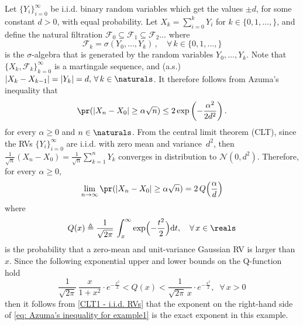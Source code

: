 \documentclass{article}
\theoremstyle{plain}
\begin{document}
\begin{example}
Let $\{Y_i\}_{i=0}^{\infty}$ be i.i.d. binary random variables
which get the values $\pm d$, for some constant $d>0$, with equal
probability. Let $X_k = \sum_{i=0}^k Y_i$ for $k \in \{0, 1,
\ldots, \}$, and define the natural filtration $\mathcal{F}_0
\subseteq \mathcal{F}_1 \subseteq \mathcal{F}_2 \ldots $ where
$$\mathcal{F}_k = \sigma(Y_0, \ldots, Y_k) \, , \quad \forall
\, k \in \{0, 1, \ldots, \}$$ is the $\sigma$-algebra that is
generated by the random variables $Y_0, \ldots, Y_k$. Note that
$\{X_k, \mathcal{F}_k\}_{k=0}^{\infty}$ is a martingale sequence, and
(a.s.) $ |X_k - X_{k-1}| = |Y_k| = d, \, \forall \, k \in
\naturals$. It therefore follows from Azuma's inequality that
\begin{equation}
\pr( | X_n - X_0 | \geq \alpha \sqrt{n}) \leq 2
\exp\left(-\frac{\alpha^2}{2d^2}\right). \label{eq: Azuma's
inequality for example1}
\end{equation}
for every $\alpha \geq 0$ and $n \in \naturals$. From the central
limit theorem (CLT), since the RVs
$\{Y_i\}_{i=0}^{\infty}$ are i.i.d. with zero mean and
variance~$d^2$, then
$\frac{1}{\sqrt{n}} (X_n - X_0) = \frac{1}{\sqrt{n}} \sum_{k=1}^n Y_k$
converges in distribution to
$\mathcal{N}(0,d^2)$. Therefore, for every $\alpha \geq 0$,
\begin{equation}
\lim_{n \rightarrow \infty} \pr( | X_n - X_0 | \geq \alpha
\sqrt{n})= 2 \, Q\Bigl(\frac{\alpha}{d}\Bigr)
\label{CLT1 - i.i.d. RVs}
\end{equation}
where
\begin{equation}
Q(x) \triangleq \frac{1}{\sqrt{2\pi}} \, \int_{x}^{\infty}
\exp\Bigl(-\frac{t^2}{2}\Bigr) \mathrm{d}t, \quad \forall \, x \in
\reals \label{eq: Q function}
\end{equation}
is the probability that a zero-mean and unit-variance Gaussian
RV is larger than $x$. Since the following exponential
upper and lower bounds on the Q-function hold
\begin{equation}
\frac{1}{\sqrt{2\pi}} \, \frac{x}{1+x^2} \cdot e^{-\frac{x^2}{2}}
< Q(x) < \frac{1}{\sqrt{2\pi} \, x} \cdot e^{-\frac{x^2}{2}}, \;
\; \forall \, x>0 \label{eq: upper and lower bounds for the Q
function}
\end{equation}
then it follows from \eqref{CLT1 - i.i.d. RVs} that the exponent
on the right-hand side of \eqref{eq: Azuma's inequality for
example1} is the exact exponent in this example. \label{example1}
\end{example}
\end{document}
